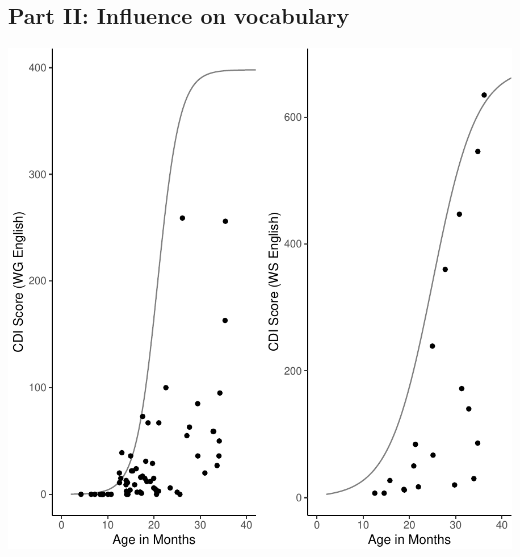 \documentclass[english,man]{apa6}
\begin{document}
\hypertarget{part-ii-influence-on-vocabulary}{%
\subsection{Part II: Influence on vocabulary}\label{part-ii-influence-on-vocabulary}}

\includegraphics{ELSSP_paper_files/figure-latex/english-curves-1.pdf}
\end{document}
